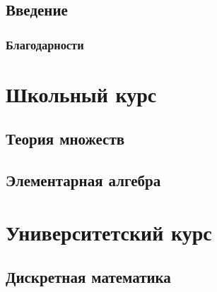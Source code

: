 \documentclass{report}
\begin{document}
\chapter*{Введение}

\section*{Благодарности}

\tableofcontents

\part{Школьный курс}
\chapter{Теория множеств}

	
	
	
\chapter{Элементарная алгебра}

	
	
	



\part{Университетский курс}
\chapter{Дискретная математика}

	
	
	
	
	
	
	
\end{document}
